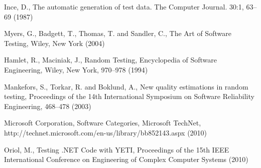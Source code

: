 \documentclass[runningheads,a4paper]{llncs}
\begin{document}
\begin{thebibliography}{5}

 Ince, D., The automatic generation of test data. The Computer Journal. 30:1, 63--69 (1987)
 
 Myers, G., Badgett, T., Thomas, T. and Sandler, C., The Art of Software Testing, Wiley, New York (2004)

 Hamlet, R., Maciniak, J., Random Testing, Encyclopedia of Software Engineering,  Wiley, New York, 970--978 (1994)

 Mankefors, S., Torkar, R. and Boklund, A., New quality estimations in random testing, Proceedings of the 14th International Symposium on Software Reliability Engineering, 468--478 (2003)

 Microsoft Corporation, Software Categories, Microsoft TechNet, http://technet.microsoft.com/en-us/library/bb852143.aspx (2010)

 Oriol, M., Testing .NET Code with YETI, Proceedings of the 15th IEEE International Conference on Engineering of Complex Computer Systems (2010)

\end{thebibliography}
\end{document}
